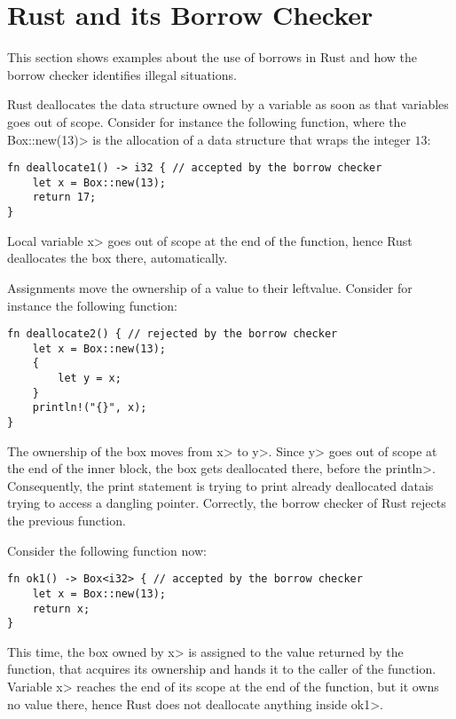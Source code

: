 \section{Rust and its Borrow Checker}\label{sec:rust}

This section shows examples about the use of borrows in
Rust and how the borrow checker identifies illegal situations.

Rust deallocates the data structure owned by a variable
as soon as that variables goes out of scope. Consider for instance
the following function, where the \<Box::new(13)> is the allocation of
a data structure that wraps the integer $13$:

\begin{verbatim}
fn deallocate1() -> i32 { // accepted by the borrow checker
    let x = Box::new(13);
    return 17;
}
\end{verbatim}

\noindent
Local variable \<x> goes out of scope at the end of the function,
hence Rust deallocates the box there, automatically.

Assignments move the ownership of a value to their leftvalue. Consider
for instance the following function:

\begin{verbatim}
fn deallocate2() { // rejected by the borrow checker
    let x = Box::new(13);
    {
        let y = x;
    }
    println!("{}", x);
}
\end{verbatim}

\noindent
The ownership of the box moves from \<x> to \<y>. Since \<y> goes out of scope
at the end of the inner block, the box gets deallocated there, before the
\<println>. Consequently, the print statement is trying to print
already deallocated data\ie is trying to access a dangling pointer.
Correctly, the borrow checker of Rust rejects the previous function.

Consider the following function now:

\begin{verbatim}
fn ok1() -> Box<i32> { // accepted by the borrow checker
    let x = Box::new(13);
    return x;
}
\end{verbatim}

\noindent
This time, the box owned by \<x> is assigned to the value returned by
the function, that acquires its ownership and hands it to the caller of
the function. Variable \<x> reaches the end of its scope at the end of the
function, but it owns no value there, hence Rust does not deallocate
anything inside \<ok1>.

